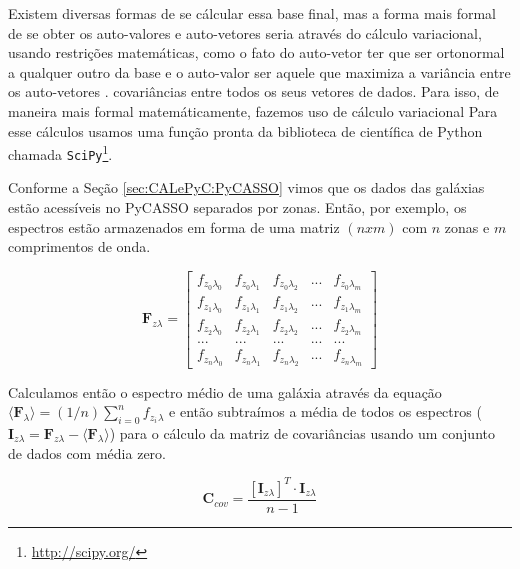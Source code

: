 \fixme Existem diversas formas de se cálcular essa base final, mas a forma mais
formal de se obter os auto-valores e auto-vetores seria através do cálculo variacional,
usando restrições matemáticas, como o fato do auto-vetor ter que ser ortonormal
a qualquer outro da base e o auto-valor ser aquele que maximiza a variância
entre os auto-vetores \citep[][cap 1]{JolliffePCA1986}. 
\fixme covariâncias entre todos os seus vetores de dados.
Para isso, de maneira mais formal matemáticamente, fazemos uso de cálculo
variacional  Para esse cálculos usamos uma função pronta da biblioteca de
científica de Python chamada \texttt{SciPy}\footnote{\url{http://scipy.org/}}.

Conforme a Seção \ref{sec:CALePyC:PyCASSO} vimos que os dados das galáxias estão
acessíveis no PyCASSO separados por zonas. Então, por exemplo, os espectros
estão armazenados em forma de uma matriz $(n x m)$ com $n$ zonas e $m$
comprimentos de onda.

\begin{equation}
    \label{eq:PCA:fluxMatrix}
    \textbf{F}{}_{z \lambda} = \left[
    \begin{array}{ccccc}
        f_{z_0 \lambda_0} & f_{z_0 \lambda_1} & f_{z_0 \lambda_2} & ... & f_{z_0 \lambda_m} \\
        f_{z_1 \lambda_0} & f_{z_1 \lambda_1} & f_{z_1 \lambda_2} & ... & f_{z_1 \lambda_m} \\
        f_{z_2 \lambda_0} & f_{z_2 \lambda_1} & f_{z_2 \lambda_2} & ... & f_{z_2 \lambda_m} \\
        ...               & ...               & ...               & ... & ...               \\
        f_{z_n \lambda_0} & f_{z_n \lambda_1} & f_{z_n \lambda_2} & ... & f_{z_n \lambda_m} 
    \end{array} 
    \right]
\end{equation}

Calculamos então o espectro médio de uma galáxia através da equação $\langle
\textbf{F}{}_\lambda \rangle = (1 / n) \sum_{i=0}^{n} f_{z_i}{}_{\lambda}$ e
então subtraímos a média de todos os espectros ($\textbf{I}{}_{z \lambda} =
\textbf{F}{}_{z \lambda} - \langle \textbf{F}{}_\lambda \rangle$) para o cálculo
da matriz de covariâncias usando um conjunto de dados com média zero.

\begin{equation}
	\label{eq:PCA:covMatrix}
	\mathbf{C}{}_{cov} = \frac{[\mathbf{I}{}_{z \lambda}]^T \cdot \mathbf{I}{}_{z
	\lambda}}{n - 1}
\end{equation}

